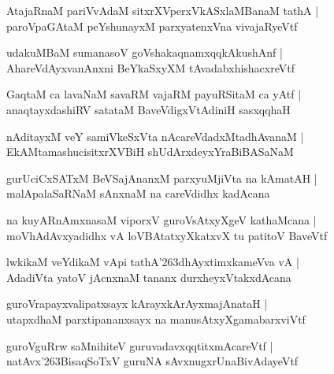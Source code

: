 \documentclass[twoside,12pt,openright]{book}
\def\S{\char'263}
\newcounter{shloka}[chapter]
\begin{document}
\begin{shloka}
AtajaRnaM pariVvAdaM sitxrXVperxVkASxlaMBanaM tathA |\\
paroVpaGAtaM peYshunayxM parxyatenxVna vivajaRyeVtf 
\end{shloka}

\begin{shloka}
udakuMBaM sumanasoV goVshakaqnamxqqkAkushAnf |\\
AhareVdAyxvanAnxni BeYkaSxyXM tAvadabxhishacxreVtf 
\end{shloka}

\begin{shloka}
GaqtaM ca lavaNaM savaRM vajaRM payuRSitaM ca yAtf |\\
anaqtayxdashiRV satataM BaveVdigxVtAdiniH sasxqqhaH 
\end{shloka}

\begin{shloka}
nAditayxM veY samiVkeSxVta nAcareVdadxMtadhAvanaM |\\
EkAMtamashucisitxrXVBiH shUdArxdeyxYraBiBASaNaM 
\end{shloka}

\begin{shloka}
gurUciCxSATxM BeVSajAnanxM parxyuMjiVta na kAmatAH |\\
malApalaSaRNaM sAnxnaM na careVdidhx kadAcana 
\end{shloka}

\begin{shloka}
na kuyARnAmxnasaM viporxV guroVsAtxyXgeV kathaMcana |\\
moVhAdAvxyadidhx vA loVBAtatxyXkatxvX tu patitoV BaveVtf 
\end{shloka}

\begin{shloka}
lwkikaM veYdikaM vApi tathA\S dhAyxtimxkameVva vA |\\
AdadiVta yatoV jAcnxnaM tananx durxheyxVtakxdAcana
\end{shloka}

\begin{shloka}
guroVrapayxvalipatxsayx kArayxkArAyxmajAnataH |\\
utapxdhaM parxtipananxsayx na manusAtxyXgamabarxviVtf 
\end{shloka}

\begin{shloka}
guroVguRrw saMnihiteV guruvadavxqqtitxmAcareVtf |\\
natAvx\S BisaqSoTxV guruNA sAvxnugxrUnaBivAdayeVtf 
\end{shloka}
\end{document}
